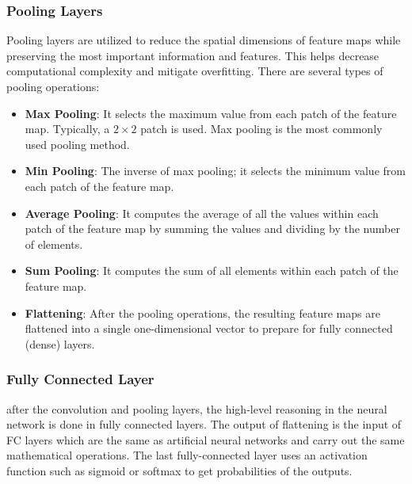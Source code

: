 \subsubsection{Pooling Layers}

Pooling layers are utilized to reduce the spatial dimensions of feature maps while preserving the most important information and features. This helps decrease computational complexity and mitigate overfitting. There are several types of pooling operations:

\begin{itemize}
  \item \textbf{Max Pooling}:
        It selects the maximum value from each patch of the feature map. Typically, a $2 \times 2$ patch is used. Max pooling is the most commonly used pooling method.

  \item \textbf{Min Pooling}:
        The inverse of max pooling; it selects the minimum value from each patch of the feature map.

  \item \textbf{Average Pooling}:
        It computes the average of all the values within each patch of the feature map by summing the values and dividing by the number of elements.

  \item \textbf{Sum Pooling}:
        It computes the sum of all elements within each patch of the feature map.

  \item \textbf{Flattening}:
        After the pooling operations, the resulting feature maps are flattened into a single one-dimensional vector to prepare for fully connected (dense) layers.
\end{itemize}

\subsubsection{Fully Connected Layer}

after the convolution and pooling layers, the high-level reasoning in the neural network is done in fully connected layers. The output of flattening is the input of FC layers which are the same as artificial neural networks and carry out the same mathematical operations. The last fully-connected layer uses an activation function such as sigmoid or softmax to get probabilities of the outputs.


